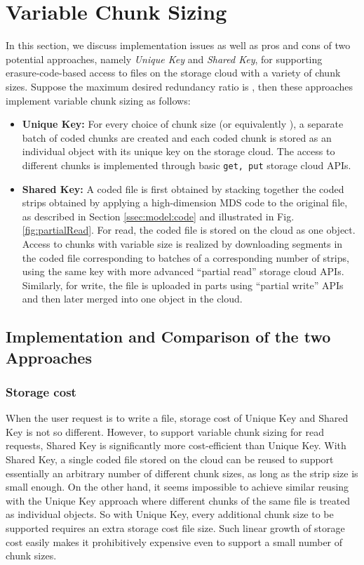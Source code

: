 \documentclass[journal]{IEEEtran}
\newif\ifnewtext
\begin{document}
\section{Variable Chunk Sizing}
\label{sec:measurement}


\ifnewtext
In this section, we discuss implementation issues as well as pros and cons of two potential approaches, namely {\em Unique Key} and {\em Shared Key}, for supporting erasure-code-based access to files on the storage cloud with a variety of chunk sizes. Suppose the maximum desired redundancy ratio is , then these approaches implement variable chunk sizing as follows:
\begin{itemize}
\item {\bf Unique Key:} For every choice of chunk size (or equivalently ), a separate batch of  coded chunks are created and each coded chunk is stored as an individual object with its unique key on the storage cloud. The access to different chunks is implemented through basic {\tt get, put} storage cloud APIs. 

\item {\bf Shared Key:} A coded file is first obtained by stacking together the coded strips obtained by applying a high-dimension  MDS code to the original file, as described in Section \ref{ssec:model:code} and illustrated in Fig.\ref{fig:partialRead}. 
For read, the coded file is stored on the cloud as one object. Access to chunks with variable size is realized by downloading segments in the coded file corresponding to batches of a corresponding number of strips, using the same key with more advanced ``partial read'' storage cloud APIs. Similarly, for write, the file is uploaded in parts using ``partial write'' APIs and then later merged into one object in the cloud.
\end{itemize}




\subsection{Implementation and Comparison of the two Approaches}
\label{ssec:measurement:partialRead}

\subsubsection{Storage cost} When the user request is to write a file, storage cost of Unique Key and Shared Key is not so different. However, to support variable chunk sizing for read requests, Shared Key is significantly more cost-efficient than Unique Key. With Shared Key, a single coded file stored on the cloud can be reused to support essentially an arbitrary number of different chunk sizes, as long as the strip size is small enough. On the other hand, it seems impossible to achieve similar reusing with the Unique Key approach where different chunks of the same file is treated as individual objects. So with Unique Key, every additional chunk size to be supported requires an extra storage cost  file size. Such linear growth of storage cost easily makes it prohibitively expensive even to support a small number of chunk sizes.
\end{document}
